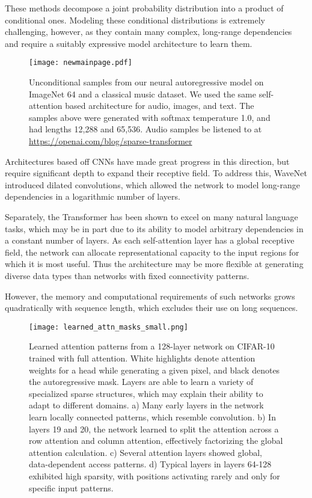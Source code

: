 \documentclass{article}
\begin{document}
These methods decompose a joint probability distribution into a product of conditional ones. Modeling these conditional distributions is extremely challenging, however, as they contain many complex, long-range dependencies and require a suitably expressive model architecture to learn them.

\begin{figure}[t]
\centering
\setlength\fboxsep{0pt}
\setlength\fboxrule{0.25pt}
\texttt{[image: newmainpage.pdf]}
\caption{Unconditional samples from our neural autoregressive model on ImageNet 64 and a classical music dataset. We used the same self-attention based architecture for audio, images, and text. The samples above were generated with softmax temperature 1.0, and had lengths 12,288 and 65,536. Audio samples be listened to at \url{https://openai.com/blog/sparse-transformer}}
\label{uncond_samples}
\end{figure}

Architectures based off CNNs \cite{oord2016pixel} have made great progress in this direction, but require significant depth to expand their receptive field. To address this, WaveNet \cite{van2016wavenet} introduced dilated convolutions, which allowed the network to model long-range dependencies in a logarithmic number of layers.

Separately, the Transformer \cite{vaswani2017attention} has been shown to excel on many natural language tasks, which may be in part due to its ability to model arbitrary dependencies in a constant number of layers. As each self-attention layer has a global receptive field, the network can allocate representational capacity to the input regions for which it is most useful. Thus the architecture may be more flexible at generating diverse data types than networks with fixed connectivity patterns.

However, the memory and computational requirements of such networks grows quadratically with sequence length, which excludes their use on long sequences.

\begin{figure*}
\centering     \texttt{[image: learned\_attn\_masks\_small.png]}
\caption{Learned attention patterns from a 128-layer network on CIFAR-10 trained with full attention. White highlights denote attention weights for a head while generating a given pixel, and black denotes the autoregressive mask. Layers are able to learn a variety of specialized sparse structures, which may explain their ability to adapt to different domains. a) Many early layers in the network learn locally connected patterns, which resemble convolution. b) In layers 19 and 20, the network learned to split the attention across a row attention and column attention, effectively factorizing the global attention calculation. c) Several attention layers showed global, data-dependent access patterns. d) Typical layers in layers 64-128 exhibited high sparsity, with positions activating rarely and only for specific input patterns.}
\label{learned_patterns}
\end{figure*}
\end{document}

